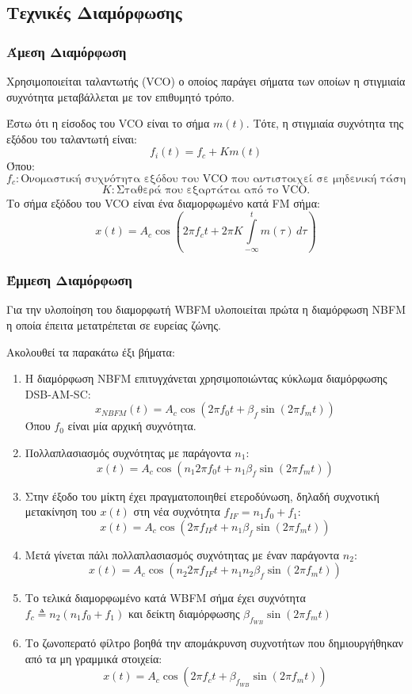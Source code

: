 \documentclass[a4paper,12pt]{article}
\begin{document}
\subsection*{Τεχνικές Διαμόρφωσης}
\subsubsection*{Άμεση Διαμόρφωση}
Χρησιμοποιείται ταλαντωτής (VCO) ο οποίος παράγει σήματα των οποίων η στιγμιαία συχνότητα μεταβάλλεται με τον επιθυμητό τρόπο.

Έστω ότι η είσοδος του VCO είναι το σήμα \(m(t)\). Τότε, η στιγμιαία συχνότητα της εξόδου του ταλαντωτή είναι:
\[
f_i(t)=f_c + Km(t)
\]
Όπου:
\[
f_c: \text{Ονομαστική συχνότητα εξόδου του VCO που αντιστοιχεί σε μηδενική τάση εισόδου. Πρόκειται για τη συχνότητα του φέροντος.}
\]
\[
K:\text{Σταθερά που εξαρτάται από το VCO.}
\]
Το σήμα εξόδου του VCO είναι ένα διαμορφωμένο κατά FM σήμα:
\[
x(t)=A_c \cos \left(2\pi f_c t + 2 \pi K \int\limits_{-\infty}^t m(\tau) \, d\tau \right)
\]

\subsubsection*{Έμμεση Διαμόρφωση}
Για την υλοποίηση του διαμορφωτή WBFM υλοποιείται πρώτα η διαμόρφωση NBFM η οποία έπειτα μετατρέπεται σε ευρείας ζώνης.

Ακολουθεί τα παρακάτω έξι βήματα:
\begin{enumerate}
\item Η διαμόρφωση NBFM επιτυγχάνεται χρησιμοποιώντας κύκλωμα διαμόρφωσης DSB-AM-SC:
\[
x_{NBFM}(t)=A_c \cos(2\pi f_0 t + \beta_f \sin(2\pi f_m t))
\]
Όπου \(f_0\) είναι μία αρχική συχνότητα.

\item Πολλαπλασιασμός συχνότητας με παράγοντα \(n_1\):
\[
x(t)=A_c \cos(n_1 2\pi f_0 t + n_1 \beta_f \sin(2\pi f_m t))
\]

\item Στην έξοδο του μίκτη έχει πραγματοποιηθεί ετεροδύνωση, δηλαδή συχνοτική μετακίνηση του \(x(t)\) στη νέα συχνότητα \(f_{IF}=n_1 f_0 + f_1\):
\[
x(t)=A_c \cos(2\pi f_{IF}t+n_1 \beta_f \sin(2\pi f_m t))
\]

\item Μετά γίνεται πάλι πολλαπλασιασμός συχνότητας με έναν παράγοντα \(n_2\):
\[
x(t)=A_c \cos (n_2 2\pi f_{IF} t + n_1 n_2 \beta_f \sin(2\pi f_m t))
\]

\item Το τελικά διαμορφωμένο κατά WBFM σήμα έχει συχνότητα \(f_c \triangleq n_2(n_1 f_0+ f_1)\) και δείκτη διαμόρφωσης \(\beta_{f_{WB}}\sin(2\pi f_m t)\)

\item Το ζωνοπερατό φίλτρο βοηθά την απομάκρυνση συχνοτήτων που δημιουργήθηκαν από τα μη γραμμικά στοιχεία:
\[
x(t)=A_c \cos(2\pi f_c t + \beta_{f_{WB}}\sin(2\pi f_m t))
\]
\end{enumerate}
\end{document}

